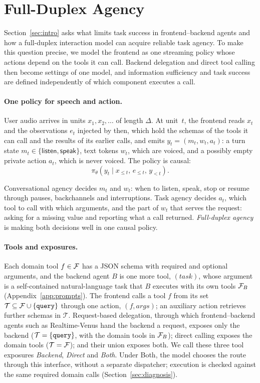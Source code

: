 \section{Full-Duplex Agency}
\label{sec:problem}

Section~\ref{sec:intro} asks what limits task success in frontend--backend agents and how a full-duplex interaction model can acquire reliable task agency.
To make this question precise, we model the frontend as one streaming policy whose actions depend on the tools it can call.
Backend delegation and direct tool calling then become settings of one model, and information sufficiency and task success are defined independently of which component executes a call.

\paragraph{One policy for speech and action.}
User audio arrives in units $x_1,x_2,\ldots$ of length $\Delta$.
At unit~$t$, the frontend reads $x_t$ and the observations $e_t$ injected by then, which hold the schemas of the tools it can call and the results of its earlier calls, and emits $y_t=(m_t,w_t,a_t)$: a turn state $m_t\in\{\textsf{listen},\textsf{speak}\}$, text tokens $w_t$, which are voiced, and a possibly empty private action $a_t$, which is never voiced.
The policy is causal:
\begin{equation}
  \pi_\theta\left(y_t \mid x_{\le t},\, e_{\le t},\, y_{<t}\right).
  \label{eq:policy}
\end{equation}

Conversational agency decides $m_t$ and $w_t$: when to listen, speak, stop or resume through pauses, backchannels and interruptions.
Task agency decides $a_t$, which tool to call with which arguments, and the part of $w_t$ that serves the request: asking for a missing value and reporting what a call returned.
\emph{Full-duplex agency} is making both decisions well in one causal policy.

\paragraph{Tools and exposures.}
Each domain tool $f\in\mathcal{F}$ has a JSON schema with required and optional arguments, and the backend agent $B$ is one more tool, $(\textit{task})$, whose argument is a self-contained natural-language task that $B$ executes with its own tools $\mathcal{F}_{B}$ (Appendix~\ref{app:prompts}).
The frontend calls a tool $f$ from its set $\mathcal{T}\subseteq\mathcal{F}\cup\{\texttt{query}\}$ through one action, $(f,\textit{args})$; an auxiliary  action retrieves further schemas in $\mathcal{T}$.
Request-based delegation, through which frontend--backend agents such as Realtime-Venus hand the backend a request, exposes only the backend ($\mathcal{T}=\{\texttt{query}\}$, with the domain tools in $\mathcal{F}_{B}$); direct calling exposes the domain tools ($\mathcal{T}=\mathcal{F}$); and their union exposes both.
We call these three tool exposures \emph{Backend}, \emph{Direct} and \emph{Both}.
Under Both, the model chooses the route through this interface, without a separate dispatcher; execution is checked against the same required domain calls (Section~\ref{sec:diagnosis}).

